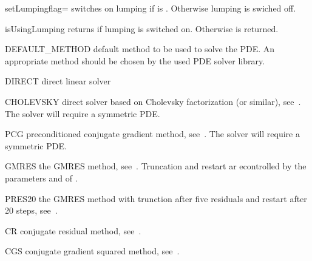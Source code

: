 \begin{methoddesc}[LinearPDE]{setLumping}{flag=\False}
switches on lumping if  is \True. Otherwise lumping is swiched off.
\end{methoddesc}

\begin{methoddesc}[LinearPDE]{isUsingLumping}{}
returns \True if lumping is switched on. Otherwise \False is returned.
\end{methoddesc}

\begin{memberdesc}[LinearPDE]{DEFAULT_METHOD}
default method to be used to solve the PDE. An appropriate method should be 
chosen by the used PDE solver library.
\end{memberdesc}

\begin{memberdesc}[LinearPDE]{DIRECT}
direct linear solver~ 
\end{memberdesc}

\begin{memberdesc}[LinearPDE]{CHOLEVSKY}
direct solver based on Cholevsky factorization (or similar), see~. The solver will require a symmetric PDE. 
\end{memberdesc}

\begin{memberdesc}[LinearPDE]{PCG}
preconditioned conjugate gradient method, see~. The solver will require a symmetric PDE.
\end{memberdesc}

\begin{memberdesc}[LinearPDE]{GMRES}
the GMRES method, see~. Truncation and restart ar econtrolled by the parameters
 and  of .
\end{memberdesc}

\begin{memberdesc}[LinearPDE]{PRES20}
the GMRES method with trunction after five residuals and
restart after 20 steps, see~.
\end{memberdesc}

\begin{memberdesc}[LinearPDE]{CR}
conjugate residual method, see~. 
\end{memberdesc}

\begin{memberdesc}[LinearPDE]{CGS}
conjugate gradient squared method, see~.
\end{memberdesc}

